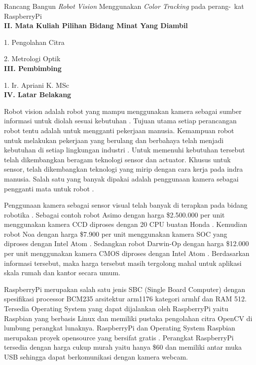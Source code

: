 \documentclass[a4paper,12pt]{article}
\begin{document}
Rancang Bangun \textit{Robot Vision} Menggunakan \textit{Color Tracking} pada perang-\ kat RaspberryPi
\\[10pt]
\noindent \textbf{II. \hspace{9pt} Mata Kuliah Pilihan Bidang Minat Yang Diambil}

1. Pengolahan Citra

2. Metrologi Optik
\\[10pt]
\noindent \textbf{III. \hspace{8pt} Pembimbing}

1. Ir. Apriani K. MSc
\\[10pt]
\noindent \textbf{IV. \hspace{9pt} Latar Belakang} 

Robot vision adalah robot yang mampu menggunakan kamera sebagai sumber informasi untuk diolah sesuai kebutuhan \cite{robot}.
Tujuan utama setiap perancangan robot tentu adalah untuk mengganti pekerjaan manusia.
Kemampuan robot untuk melakukan pekerjaan yang berulang dan berbahaya telah menjadi kebutuhan di setiap lingkungan industri \cite{robot_function} . 
Untuk memenuhi kebutuhan tersebut telah dikembangkan beragam teknologi sensor dan actuator.
Khusus untuk sensor, telah dikembangkan teknologi yang mirip dengan cara kerja pada indra manusia.
Salah satu yang banyak dipakai adalah penggunaan kamera sebagai pengganti mata untuk robot \cite{robot}.

Penggunaan kamera sebagai sensor visual telah banyak di terapkan pada bidang robotika \cite{robot}.
Sebagai contoh robot Asimo dengan harga \$2.500.000 per unit menggunakan kamera CCD diproses dengan 20 CPU buatan Honda \cite{asimo}.
Kemudian robot Noa dengan harga \$7.900 per unit menggunakan kamera SOC yang diproses dengan Intel Atom \cite{nao}.
Sedangkan robot Darwin-Op dengan harga \$12.000 per unit menggunakan kamera CMOS diproses dengan Intel Atom \cite{darwinop}.
Berdasarkan informasi tersebut, maka harga tersebut masih tergolong mahal untuk aplikasi skala rumah dan kantor secara umum.

RaspberryPi merupakan salah satu jenis SBC (Single Board Computer) dengan spesifikasi processor BCM235 arsitektur arm1176 kategori armhf dan RAM 512.
Tersedia Operating System yang dapat dijalankan oleh RaspberryPi yaitu Raspbian yang berbasis Linux dan memiliki pustaka pengolahan citra OpenCV di lumbung perangkat lunaknya.
RaspberryPi dan Operating System Raspbian merupakan proyek opensource yang bersifat gratis \cite{raspi}.
Perangkat RaspberryPi tersedia dengan harga cukup murah yaitu hanya \$60 dan memiliki antar muka USB sehingga dapat berkomunikasi dengan kamera webcam.
\end{document}
